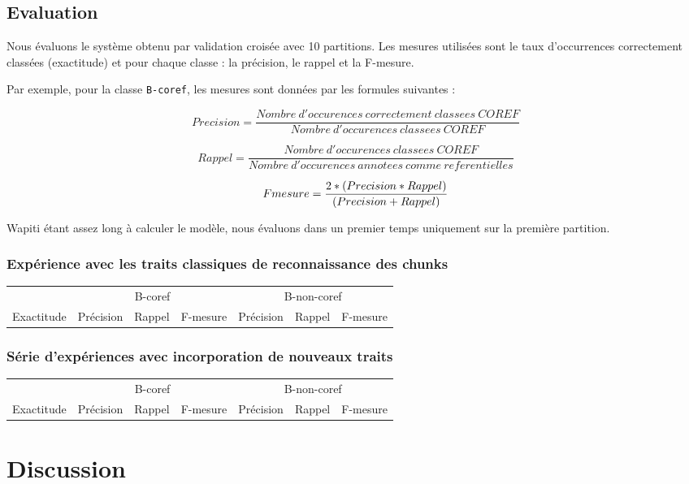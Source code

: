 \documentclass[a4paper,12pt]{article}
\begin{document}
\subsection{Evaluation}

Nous évaluons le système obtenu par validation croisée avec 10 partitions. Les mesures utilisées sont le taux d'occurrences correctement classées (exactitude) et pour chaque classe : la précision, le rappel et la F-mesure.

Par exemple, pour la classe \verb!B-coref!, les mesures sont données par les formules suivantes :

\[ Precision = \frac{Nombre\ d'occurences\ correctement\ classees\ COREF}{Nombre\ d'occurences\ classees\ COREF} \]

\[ Rappel = \frac{Nombre\ d'occurences\ classees\ COREF}{Nombre\ d'occurences\ annotees\ comme\ referentielles} \]

\[ F\-mesure = \frac{2 * (Precision * Rappel)}{(Precision + Rappel)} \]

Wapiti étant assez long à calculer le modèle, nous évaluons dans un premier temps uniquement sur la première partition.

\subsubsection{Expérience avec les traits classiques de reconnaissance des chunks}

\begin{tabular}[H]{l|lll|lll}
& \multicolumn{3}{c|}{B-coref} & \multicolumn{3}{c}{B-non-coref}\\
Exactitude & Précision & Rappel & F-mesure & Précision & Rappel & F-mesure\\
\hline
\end{tabular}

\subsubsection{Série d'expériences avec incorporation de nouveaux traits}

\begin{tabular}[H]{l|lll|lll}
& \multicolumn{3}{c|}{B-coref} & \multicolumn{3}{c}{B-non-coref}\\
Exactitude & Précision & Rappel & F-mesure & Précision & Rappel & F-mesure\\
\hline
\end{tabular}

\section{Discussion}
\end{document}
